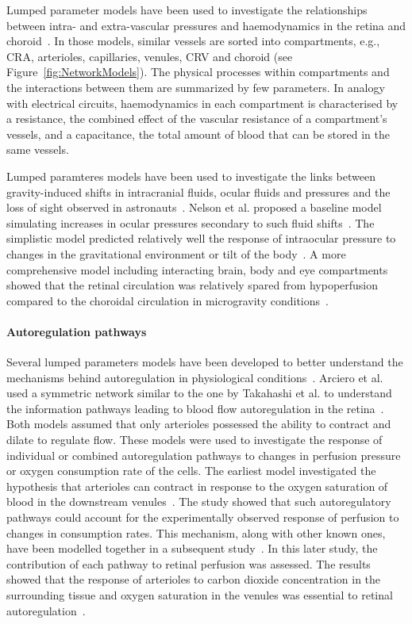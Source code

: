 \documentclass{article}
\begin{document}
Lumped parameter models have been used to investigate the relationships between intra- and extra-vascular pressures and haemodynamics in the retina and choroid~\cite{Chiaravalli_2021,Fawzi_2019,Guidoboni_2014a,Nelson_2017,Petersen_2022,Prudhomme_2021,Sala_2020,Salerni_2019}.
In those models, similar vessels are sorted into compartments, e.g., CRA, arterioles, capillaries, venules, CRV and choroid (see Figure~\ref{fig:NetworkModels}).
The physical processes within compartments and the interactions between them are summarized by few parameters.
In analogy with electrical circuits, haemodynamics in each compartment is characterised by a resistance, the combined effect of the vascular resistance of a compartment's vessels, and a capacitance, the total amount of blood that can be stored in the same vessels.

Lumped paramteres models have been used to investigate the links between gravity-induced shifts in intracranial fluids, ocular fluids and pressures and the loss of sight observed in astronauts~\cite{Nelson_2017,Petersen_2022,Salerni_2019}.
Nelson et al. proposed a baseline model simulating increases in ocular pressures secondary to such fluid shifts~\cite{Nelson_2017}.
The simplistic model predicted relatively well the response of intraocular pressure to changes in the gravitational environment or tilt of the body~\cite{Nelson_2017,Petersen_2022}.
A more comprehensive model including interacting brain, body and eye compartments showed that the retinal circulation was relatively spared from hypoperfusion compared to the choroidal circulation in microgravity conditions~\cite{Salerni_2019}.


\paragraph*{Autoregulation pathways}

Several lumped parameters models have been developed to better understand the mechanisms behind autoregulation in physiological conditions~\cite{Arciero_2008,Arciero_2013,Guidoboni_2014a}.
Arciero et al. used a symmetric network similar to the one by Takahashi et al. to understand the information pathways leading to blood flow autoregulation in the retina~\cite{Arciero_2008,Arciero_2013}.
Both models assumed that only arterioles possessed the ability to contract and dilate to regulate flow.
These models were used to investigate the response of individual or combined autoregulation pathways to changes in perfusion pressure or oxygen consumption rate of the cells.
The earliest model investigated the hypothesis that arterioles can contract in response to the oxygen saturation of blood in the downstream venules~\cite{Arciero_2008}.
The study showed that such autoregulatory pathways could account for the experimentally observed response of perfusion to changes in consumption rates.
This mechanism, along with other known ones, have been modelled together in a subsequent study~\cite{Arciero_2013}.
In this later study, the contribution of each pathway to retinal perfusion was assessed.
The results showed that the response of arterioles to carbon dioxide concentration in the surrounding tissue and oxygen saturation in the venules was essential to retinal autoregulation~\cite{Arciero_2013}.
\end{document}

